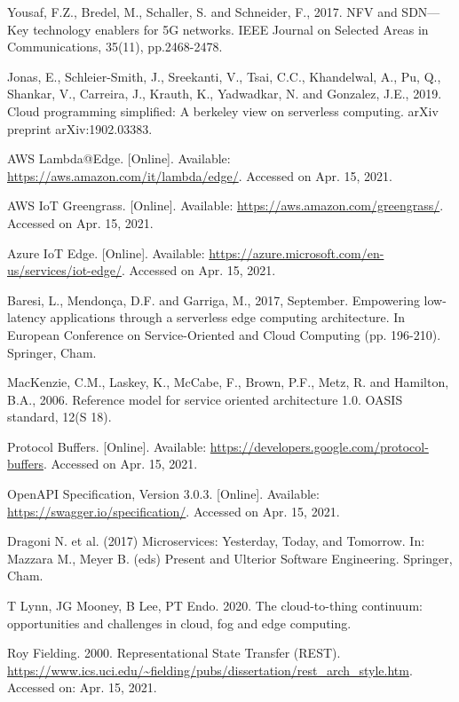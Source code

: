 \begin{thebibliography}{00}
 Yousaf, F.Z., Bredel, M., Schaller, S. and Schneider, F., 2017. NFV and SDN—Key technology enablers for 5G networks. IEEE Journal on Selected Areas in Communications, 35(11), pp.2468-2478.

 Jonas, E., Schleier-Smith, J., Sreekanti, V., Tsai, C.C., Khandelwal, A., Pu, Q., Shankar, V., Carreira, J., Krauth, K., Yadwadkar, N. and Gonzalez, J.E., 2019. Cloud programming simplified: A berkeley view on serverless computing. arXiv preprint arXiv:1902.03383.

 AWS Lambda@Edge. [Online]. Available: \url{https://aws.amazon.com/it/lambda/edge/}. Accessed on Apr. 15, 2021.

 AWS IoT Greengrass. [Online]. Available: \url{https://aws.amazon.com/greengrass/}. Accessed on Apr. 15, 2021.

 Azure IoT Edge. [Online]. Available: \url{https://azure.microsoft.com/en-us/services/iot-edge/}. Accessed on Apr. 15, 2021.

 Baresi, L., Mendonça, D.F. and Garriga, M., 2017, September. Empowering low-latency applications through a serverless edge computing architecture. In European Conference on Service-Oriented and Cloud Computing (pp. 196-210). Springer, Cham.

 MacKenzie, C.M., Laskey, K., McCabe, F., Brown, P.F., Metz, R. and Hamilton, B.A., 2006. Reference model for service oriented architecture 1.0. OASIS standard, 12(S 18).

 Protocol Buffers. [Online]. Available: \url{https://developers.google.com/protocol-buffers}. Accessed on Apr. 15, 2021.

 OpenAPI Specification, Version 3.0.3. [Online]. Available: \url{https://swagger.io/specification/}. Accessed on Apr. 15, 2021.

 Dragoni N. et al. (2017) Microservices: Yesterday, Today, and Tomorrow. In: Mazzara M., Meyer B. (eds) Present and Ulterior Software Engineering. Springer, Cham.

 T Lynn, JG Mooney, B Lee, PT Endo. 2020. The cloud-to-thing continuum: opportunities and challenges in cloud, fog and edge computing.

 Roy Fielding. 2000. Representational State Transfer (REST). \url{https://www.ics.uci.edu/~fielding/pubs/dissertation/rest\_arch\_style.htm}. Accessed on: Apr. 15, 2021.


\end{thebibliography}
